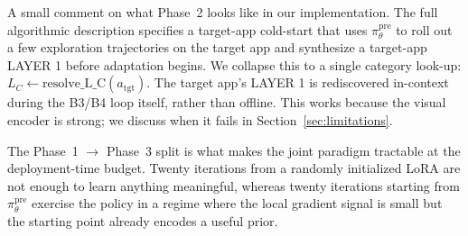 A small comment on what Phase~2 looks like in our implementation. The full algorithmic description specifies a target-app cold-start that uses $\pi^{\text{pre}}_\theta$ to roll out a few exploration trajectories on the target app and synthesize a target-app LAYER 1 before adaptation begins. We collapse this to a single category look-up: $L_C \leftarrow \mathrm{resolve\_L\_C}(a_{\text{tgt}})$. The target app's LAYER 1 is rediscovered in-context during the B3/B4 loop itself, rather than offline. This works because the visual encoder is strong; we discuss when it fails in Section~\ref{sec:limitations}.

The Phase~1 $\to$ Phase~3 split is what makes the joint paradigm tractable at the deployment-time budget. Twenty iterations from a randomly initialized LoRA are not enough to learn anything meaningful, whereas twenty iterations starting from $\pi^{\text{pre}}_\theta$ exercise the policy in a regime where the local gradient signal is small but the starting point already encodes a useful prior.
